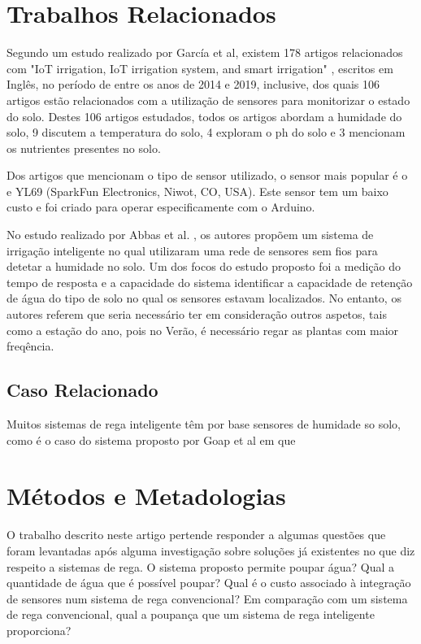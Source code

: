 \documentclass[conference]{IEEEtran}
\begin{document}
\section{Trabalhos Relacionados}
Segundo um estudo realizado por García et al, existem 178 artigos relacionados com  
"IoT irrigation, IoT irrigation system, and smart irrigation" \cite{garcia2020iot}, escritos em Inglês, 
no período de entre os anos de 2014 e 2019, inclusive, dos quais 106 artigos estão 
relacionados com a utilização de sensores para monitorizar o estado do solo. 
Destes 106 artigos estudados, todos os artigos abordam a humidade do solo, 
9 discutem a temperatura do solo, 4 exploram o ph do solo e 3 mencionam os 
nutrientes presentes no solo.

Dos artigos que mencionam o tipo de sensor utilizado, o sensor mais popular é o 
e YL69 (SparkFun Electronics, Niwot, CO, USA). Este sensor tem um baixo custo e 
foi criado para operar especificamente com o Arduino. \cite{garcia2020iot}

No estudo realizado por Abbas et al. \cite{abbas2014smart}, os autores propõem um sistema de irrigação inteligente
no qual utilizaram uma rede de sensores sem fios para detetar a humidade no solo. Um dos focos do estudo proposto 
foi a medição do tempo de resposta e a capacidade do sistema identificar a capacidade de retenção de água do tipo 
de solo no qual os sensores estavam localizados. No entanto, os autores referem que seria necessário ter em 
consideração outros aspetos, tais como a estação do ano, pois no Verão, é necessário regar as plantas
 com maior freqência.

\subsection{Caso Relacionado}

Muitos sistemas de rega inteligente têm por base sensores de humidade so solo, como 
é o caso do sistema proposto por Goap et al \cite{goap2018an} em que 

\section{Métodos e Metadologias}

O trabalho descrito neste artigo pertende responder a algumas questões que foram 
levantadas após alguma investigação sobre soluções já existentes no que diz respeito 
a sistemas de rega. O sistema proposto permite poupar água? Qual a quantidade de água 
que é possível poupar?  Qual é o custo associado à integração de sensores num sistema 
de rega convencional? Em comparação com um sistema de rega convencional, 
qual a poupança que um sistema de rega inteligente proporciona?
\end{document}
